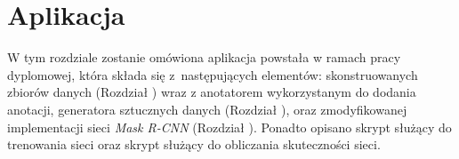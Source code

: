 \chapter{Aplikacja}
\label{sec:aplikacja}
W tym rozdziale zostanie omówiona aplikacja powstała w ramach pracy dyplomowej, która składa się z~następujących elementów: skonstruowanych zbiorów danych (Rozdział ) wraz z anotatorem wykorzystanym do dodania anotacji, generatora sztucznych danych (Rozdział ), oraz zmodyfikowanej implementacji sieci \textit{Mask R-CNN} (Rozdział ).
Ponadto opisano skrypt służący do trenowania sieci oraz skrypt służący do obliczania skuteczności sieci.

